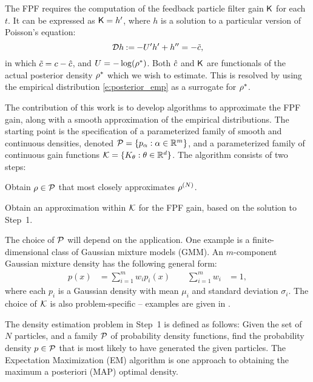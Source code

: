 The FPF requires the computation of the feedback particle filter gain $\text{\sf K}$ for each $t$. It can be expressed as $\text{\sf K}= h'$, where $h$ is a solution to a particular version of Poisson's equation:
\begin{equation}
\clD h
\eqdef
-U' h'+ h'' = -\tilc ,
\label{eq_fish}
\end{equation}
in which $\tilde c = c - {\hat c}$,  and $U = -\log(\rho^*) $.
Both ${\hat c}$ and $\text{\sf K}$ are functionals of the actual posterior density $\rho^*$  which we wish to estimate.  This is resolved by using the empirical distribution \eqref{e:posterior_emp} as a surrogate for $\rho^*$.


The contribution of this work is to develop algorithms to approximate the FPF gain, along with a smooth approximation of the empirical distributions.  The starting point is the specification of a parameterized family  of smooth and continuous densities, denoted  ${\cal P} = \{ p_\alpha : \alpha\in\mathbb{R}^m\}$,  and a parameterized family of continuous gain functions ${\cal K} = \{K_\theta : \theta\in\mathbb{R}^d\}$.
The algorithm consists of two steps:
\begin{arabnum}
	\item Obtain $\rho\in{\cal P} $ that most closely approximates $\rho^{(N)}$.
	\item  Obtain an approximation within ${\cal K}$ for the FPF gain, based on the solution to Step~1.
\end{arabnum}
The choice of ${\cal P}$ will depend on the application.
One example is a finite-dimensional class of Gaussian mixture models (GMM). An $m$-component Gaussian mixture density has the following general form:
\begin{equation*}
\begin{aligned}
p(x)& = \sum_{i=1}^{m} w_{i} p_{i}(x) \qquad  \sum_{i=1}^{m} w_{i} &=1 ,
\label{gaussian_mix}
\end{aligned}
\end{equation*}
\noindent
where each $p_{i}$ is a Gaussian density with mean $\mu_{i}$ and standard deviation $\sigma_{i}$.
The choice of ${\cal K}$ is also problem-specific -- examples are given in .

The density estimation problem in Step~1 is defined as follows: Given the set of $N$ particles, and a family ${\cal P} $ of probability density functions,  find the probability density $p \in {\cal P} $ that is most likely to have generated the given particles.  The
Expectation Maximization (EM) algorithm is one approach to obtaining the maximum a posteriori (MAP) optimal density.

